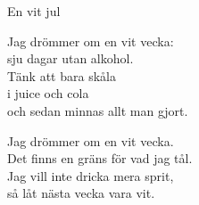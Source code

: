 \begin{song}{En vit jul}
	
	
	
	Jag drömmer om en vit vecka:\\
	sju dagar utan alkohol.\\
	Tänk att bara skåla\\
	i juice och cola\\
	och sedan minnas allt man gjort.
	
	Jag drömmer om en vit vecka.\\
	Det finns en gräns för vad jag tål.\\
	Jag vill inte dricka mera sprit,\\
	så låt nästa vecka vara vit.
	
\end{song}
